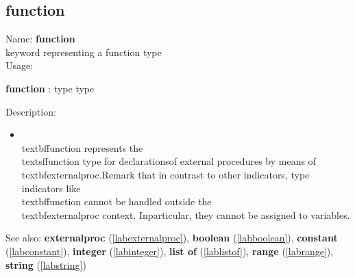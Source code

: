 \subsection{function}
\label{labfunction}
\noindent Name: \textbf{function}\\
keyword representing a \textsf{function} type \\
\noindent Usage: 
\begin{center}
\textbf{function} : \textsf{type type}\\
\end{center}
\noindent Description: \begin{itemize}

\item \\textbf{function} represents the \\textsf{function} type for declarations\n   of external procedures by means of \\textbf{externalproc}.\n    \n   Remark that in contrast to other indicators, type indicators like\n   \\textbf{function} cannot be handled outside the \\textbf{externalproc} context.  In\n   particular, they cannot be assigned to variables.\n\end{itemize}
See also: \textbf{externalproc} (\ref{labexternalproc}), \textbf{boolean} (\ref{labboolean}), \textbf{constant} (\ref{labconstant}), \textbf{integer} (\ref{labinteger}), \textbf{list of} (\ref{lablistof}), \textbf{range} (\ref{labrange}), \textbf{string} (\ref{labstring})

